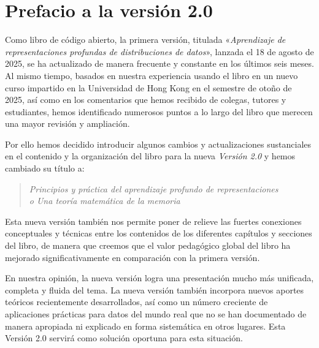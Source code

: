 \documentclass[../../book-main_es.tex]{subfiles}
\begin{document}
\chapter*{Prefacio a la versión 2.0}



Como libro de código abierto, la primera versión, titulada «{\em Aprendizaje de representaciones 
profundas de distribuciones de datos}», lanzada el 18 de agosto de 2025, se ha actualizado de manera frecuente y constante en los últimos seis meses. 
Al mismo tiempo, basados en nuestra experiencia usando el libro en un nuevo curso impartido 
en la Universidad de Hong Kong en el semestre de otoño de 2025, así como en los comentarios que hemos 
recibido de colegas, tutores y estudiantes, hemos identificado numerosos puntos a lo largo 
del libro que merecen una mayor revisión y ampliación.

Por ello hemos decidido introducir algunos cambios y actualizaciones sustanciales en el contenido 
y la organización del libro para la nueva \textit{Versión 2.0} y hemos cambiado su título a:
\begin{quote}
    \centering 
    {\em Principios y práctica del aprendizaje profundo de representaciones} \\
    {\em o Una teoría matemática de la memoria}
\end{quote}
Esta nueva versión también nos permite poner de relieve las fuertes conexiones conceptuales y 
técnicas entre los contenidos de los diferentes capítulos y secciones del libro, de manera 
que creemos que el valor pedagógico global del libro ha mejorado significativamente 
en comparación con la primera versión. 

En nuestra opinión, la nueva versión logra una presentación mucho más unificada, completa y 
fluida del tema. La nueva versión también incorpora nuevos aportes teóricos recientemente desarrollados, 
así como un número creciente de aplicaciones prácticas para datos del mundo real que no se han documentado 
de manera apropiada ni explicado en forma sistemática en otros lugares. Esta Versión 2.0 servirá como 
solución oportuna para esta situación.
\end{document}
